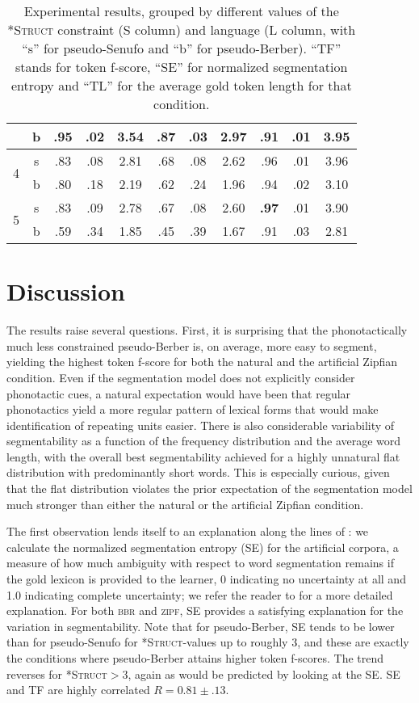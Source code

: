 \documentclass[11pt]{article}
\begin{document}
\begin{table*}[t!]
\begin{center}
{\begin{tabular}{|c|c||c|c|c||c|c|c||c|c|c|}
\cline{2-11} 
 & b & \textbf{.95} & .02 & 3.54 & .87 & .03 & 2.97 & .91 & .01 & 3.95\tabularnewline
\hline 
\hline 
\multirow{2}{*}{4} & s & .83 & .08 & 2.81 & .68 & .08 & 2.62 & .96 & .01 & 3.96\tabularnewline
\cline{2-11} 
 & b & .80 & .18 & 2.19 & .62 & .24 & 1.96 & .94 & .02 & 3.10\tabularnewline
\hline 
\hline 
\multirow{2}{*}{5} & s & .83 & .09 & 2.78 & .67 & .08 & 2.60 & \textbf{.97}  & .01 & 3.90\tabularnewline
\cline{2-11} 
 & b & .59  & .34 & 1.85 & .45 & .39 & 1.67 & .91  & .03 & 2.81\tabularnewline
\hline 
\end{tabular}}
\end{center}
\caption{\label{Results.}Experimental results, grouped by different values of the \textsc{*Struct} constraint (S column) and language (L column, with ``s'' for pseudo-Senufo and ``b'' for pseudo-Berber). ``TF'' stands for token f-score, ``SE'' for normalized segmentation entropy and ``TL'' for the average gold token length for that condition.}	
\end{table*}

\section{Discussion}
\vspace*{-5pt}
The results raise several questions. First, it is surprising that the phonotactically much less constrained pseudo-Berber is, on average, more easy to segment, yielding the highest token f-score for both the natural and the artificial Zipfian condition. Even if the segmentation model does not explicitly consider phonotactic cues, a natural expectation would have been that regular phonotactics yield a more regular pattern of lexical forms that would make identification of repeating units easier. There is also considerable variability of segmentability as a function of the frequency distribution and the average word length, with the overall best segmentability achieved for a highly unnatural flat distribution with predominantly short words. This is especially curious, given that the flat distribution violates the prior expectation of the segmentation model much stronger than either the natural or the artificial Zipfian condition.

The first observation lends itself to an explanation along the lines of \cite{Fourtassi13a}: we calculate the normalized segmentation entropy (SE) for the artificial corpora, a measure of how much ambiguity with respect to word segmentation remains if the gold lexicon is provided to the learner, 0 indicating no uncertainty at all and 1.0 indicating complete uncertainty; we refer the reader to \cite{Fourtassi13a} for a more detailed explanation. For both \textsc{bbr} and \textsc{zipf}, SE provides a satisfying explanation for the variation in segmentability. Note that for pseudo-Berber, SE tends to be lower than for pseudo-Senufo for \textsc{*Struct}-values up to roughly 3, and these are exactly the conditions where pseudo-Berber attains higher token f-scores. The trend reverses for \textsc{*Struct}$>$3, again as would be predicted by looking at the SE. SE and TF are highly correlated $R = 0.81 \pm .13$.
\end{document}
